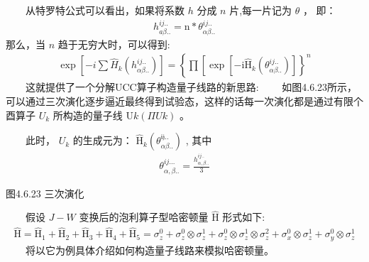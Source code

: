 \documentclass[a4paper,11pt,english]{sphinxmanual}
\begin{document}
\sphinxAtStartPar
  从特罗特公式可以看出，如果将系数 \(h\) 分成 \(n\) 片,每一片记为  \(\theta\) ， 即：
\begin{equation*}
\begin{split}h_{a \beta . .}^{i j ..}=\mathrm{n} * \theta_{\alpha \beta ..}^{i j ..}\end{split}
\end{equation*}
\sphinxAtStartPar
那么，当 \(n\) 趋于无穷大时，可以得到:
\begin{equation*}
\begin{split}\exp \left[-i \sum \hat{H}_{k}\left(h_{\alpha \beta . .}^{i j ..}\right)\right]=\left\{\prod\left[\exp \left[-\mathrm{i\hat{H}}_{k}\left(\theta_{\alpha \beta . .}^{i j ..}\right)\right]\right\}^{n}\right.\end{split}
\end{equation*}
\sphinxAtStartPar
  这就提供了一个分解UCC算子构造量子线路的新思路:   如图4.6.23所示，可以通过三次演化逐步逼近最终得到试验态，这样的话每一次演化都是通过有限个酉算子 \(U_k\) 所构造的量子线 \(\mathrm{U}{k}\left(\Pi U{k}\right)\) 。

\sphinxAtStartPar
  此时， \(U_k\) 的生成元为：  \(\mathrm{\hat{H}}_{k}\left(\theta_{\alpha \beta ..}^{\mathfrak{ij} ..}\right)\) , 其中
\begin{equation*}
\begin{split}\theta_{\alpha, \beta . .}^{ij \ldots}=\frac{h_{\alpha, \beta . .}^{ij..}}{3}\end{split}
\end{equation*}

\begin{center}图4.6.23 三次演化
\end{center}
\sphinxAtStartPar
{}

\sphinxAtStartPar
  假设 \(J-W\) 变换后的泡利算子型哈密顿量 \(\mathrm{\hat{H}}\) 形式如下:
\begin{equation*}
\begin{split}\mathrm{\hat{H}}=\mathrm{\hat{H}}_{1}+\mathrm{\hat{H}}_{2}+\mathrm{\hat{H}}_{3}+\mathrm{\hat{H}}_{4}+\mathrm{\hat{H}}_{5}=\sigma_{z}^{0}+\sigma_{z}^{0} \otimes \sigma_{z}^{1}+\sigma_{z}^{0} \otimes \sigma_{z}^{1} \otimes \sigma_{z}^{2}+\sigma_{x}^{0} \otimes \sigma_{z}^{1}+\sigma_{y}^{0} \otimes \sigma_{z}^{1}\end{split}
\end{equation*}
\sphinxAtStartPar
  将以它为例具体介绍如何构造量子线路来模拟哈密顿量。
\end{document}
